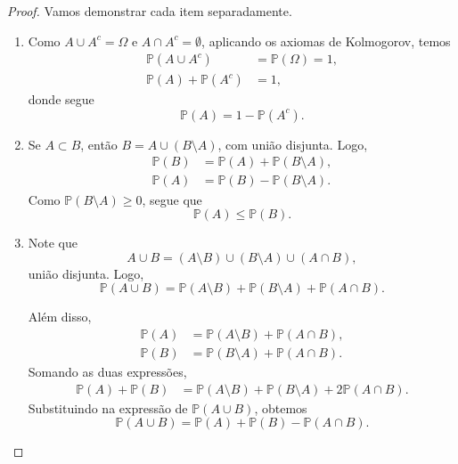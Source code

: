 \begin{proof}
Vamos demonstrar cada item separadamente.

\begin{enumerate}
    \item[(i)] Como $A \cup A^c = \Omega$ e $A \cap A^c = \emptyset$, aplicando os axiomas de Kolmogorov, temos
    \begin{align*}
        \mathbb{P}(A \cup A^c) &= \mathbb{P}(\Omega) = 1, \\
        \mathbb{P}(A) + \mathbb{P}(A^c) &= 1,
    \end{align*}
    donde segue
    \begin{equation*}
        \mathbb{P}(A) = 1 - \mathbb{P}(A^c).
    \end{equation*}

    \item[(ii)] Se $A \subset B$, então $B = A \cup (B \setminus A)$, com união disjunta. Logo,
    \begin{align*}
        \mathbb{P}(B) &= \mathbb{P}(A) + \mathbb{P}(B \setminus A), \\
        \mathbb{P}(A) &= \mathbb{P}(B) - \mathbb{P}(B \setminus A).
    \end{align*}
    Como $\mathbb{P}(B \setminus A) \geq 0$, segue que
    \begin{equation*}
        \mathbb{P}(A) \leq \mathbb{P}(B).
    \end{equation*}

    \item[(iii)] Note que
    \begin{equation*}
        A \cup B = (A \setminus B) \cup (B \setminus A) \cup (A \cap B),
    \end{equation*}
    união disjunta. Logo,
    \begin{equation}
        \mathbb{P}(A \cup B) = \mathbb{P}(A \setminus B) + \mathbb{P}(B \setminus A) + \mathbb{P}(A \cap B).
    \end{equation}
    
    Além disso,
    \begin{align*}
        \mathbb{P}(A) &= \mathbb{P}(A \setminus B) + \mathbb{P}(A \cap B), \\
        \mathbb{P}(B) &= \mathbb{P}(B \setminus A) + \mathbb{P}(A \cap B).
    \end{align*}
    Somando as duas expressões,
    \begin{align*}
        \mathbb{P}(A) + \mathbb{P}(B)
        &= \mathbb{P}(A \setminus B) + \mathbb{P}(B \setminus A) + 2\mathbb{P}(A \cap B).
    \end{align*}
    Substituindo na expressão de $\mathbb{P}(A \cup B)$, obtemos
    \begin{equation*}
        \mathbb{P}(A \cup B) = \mathbb{P}(A) + \mathbb{P}(B) - \mathbb{P}(A \cap B).
    \end{equation*}

\end{enumerate}
\end{proof}

